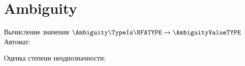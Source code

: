 \section{Ambiguity}
\begin{frame}{Вычисление значения $\Ambiguity\TypeIs\NFATYPE\to\AmbiguityValueTYPE$}
	Автомат:


	Оценка степени неоднозначности:

\end{frame}
